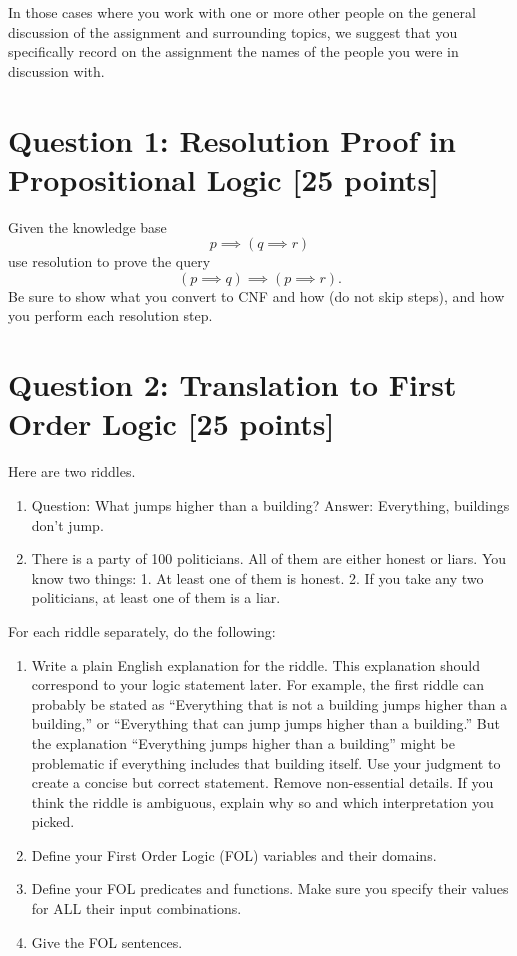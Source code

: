 \documentclass{article}
\begin{document}
In those cases where you work with one or more other people on the general discussion of the assignment and surrounding topics, we suggest that you 
specifically record on the assignment the names of the people you were in discussion with.

\newpage



\section*{Question 1: Resolution Proof in Propositional Logic [25 points]}
Given the knowledge base 
$$p \implies (q \implies r)$$
use resolution to prove the query
$$(p \implies q) \implies (p \implies r).$$
Be sure to show what you convert to CNF and how (do not skip steps), and how you perform each resolution step.

\section*{Question 2: Translation to First Order Logic [25 points]}
Here are two riddles.

\begin{enumerate}
\item
Question: What jumps higher than a building?
Answer: Everything, buildings don't jump.

\item
There is a party of 100 politicians. All of them are either honest or liars. You know two things:
1. At least one of them is honest.
2. If you take any two politicians, at least one of them is a liar.

\end{enumerate}

For each riddle separately, do the following:
\begin{enumerate}
\item
Write a plain English explanation for the riddle.  This explanation should correspond to your logic statement later.  For example, the first riddle can probably be stated as 
``Everything that is not a building jumps higher than a building,'' or 
``Everything that can jump jumps higher than a building.'' 
But the explanation ``Everything jumps higher than a building'' might be problematic if everything includes that building itself.
Use your judgment to create a concise but correct statement.  
Remove non-essential details.
If you think the riddle is ambiguous, explain why so and which interpretation you picked.

\item Define your First Order Logic (FOL) variables and their domains.

\item Define your FOL predicates and functions.  Make sure you specify their values for ALL their input combinations.

\item Give the FOL sentences.

\end{enumerate}
\end{document}
